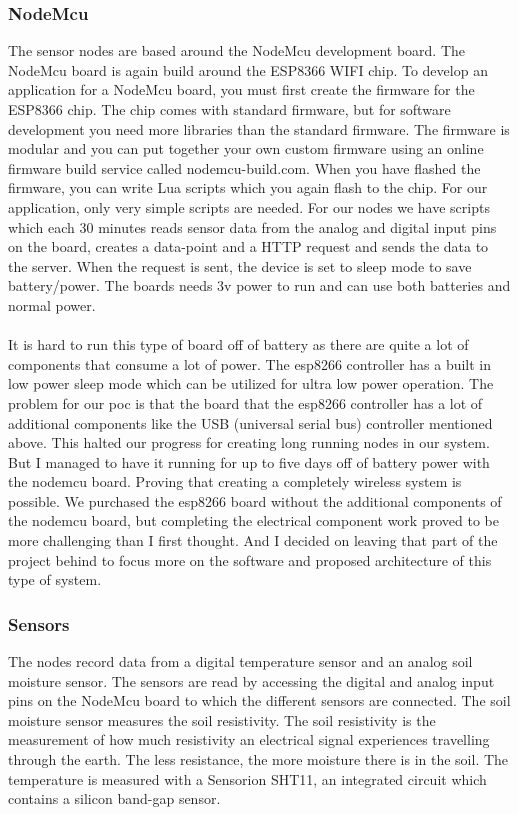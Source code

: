 \documentclass[]{uiophd}
\begin{document}
\subsubsection{NodeMcu}
The sensor nodes are based around the NodeMcu development board. The NodeMcu board is again build around the ESP8366 WIFI chip. To develop an application for a NodeMcu board, you must first create the firmware for the ESP8366 chip. The chip comes with standard firmware, but for software development you need more libraries than the standard firmware. The firmware is modular and you can put together your own custom firmware using an online firmware build service called nodemcu-build.com. When you have flashed the firmware, you can write Lua scripts which you again flash to the chip. For our application, only very simple scripts are needed. For our nodes we have scripts which each 30 minutes reads sensor data from the analog and digital input pins on the board, creates a data-point and a HTTP request and sends the data to the server. When the request is sent, the device is set to sleep mode to save battery/power. The boards needs 3v power to run and can use both batteries and normal power.
\\\\
It is hard to run this type of board off of battery as there are quite a lot of components that consume a lot of power. The esp8266 controller has a built in low power sleep mode which can be utilized for ultra low power operation. The problem for our poc is that the board that the esp8266 controller has a lot of additional components like the USB (universal serial bus) controller mentioned above. This halted our progress for creating long running nodes in our system. But I managed to have it running for up to five days off of battery power with the nodemcu board. Proving that creating a completely wireless system is possible. We purchased the esp8266 board without the additional components of the nodemcu board, but completing the electrical component work proved to be more challenging than I first thought. And I decided on leaving that part of the project behind to focus more on the software and proposed architecture of this type of system.

\subsubsection{Sensors}
The nodes record data from a digital temperature sensor and an analog soil moisture sensor. The sensors are read by accessing the digital and analog input pins on the NodeMcu board to which the different sensors are connected. The soil moisture sensor measures the soil resistivity. The soil resistivity is the measurement of how much resistivity an electrical signal experiences travelling through the earth. The less resistance, the more moisture there is in the soil. The temperature is measured with a Sensorion SHT11, an integrated circuit which contains a silicon band-gap sensor.
\end{document}
